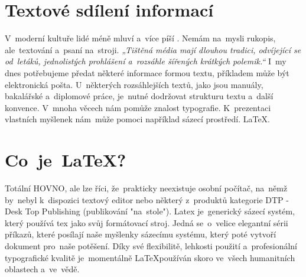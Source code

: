 \documentclass[11pt,a4paper,titlepage]{article}
\begin{document}
\section{Textové sdílení informací}
V~moderní kultuře lidé méně mluví a~více píší . Nemám na~mysli rukopis, ale~textování a~psaní na~stroji.
\cite{Ar_Luv2TxT}
\textit{„Tištěná média mají dlouhou tradici, odvíjející se od~letáků, jednolistých prohlášení a~rozsáhle šířených krátkých polemik.“}\cite{Douda_informace} I~my dnes potřebujeme předat některé informace formou textu, příkladem může být elektronická pošta. U~některých rozsáhlejších textů, jako jsou manuály, bakalářské a~diplomové práce, je~nutné dodržovat strukturu textu a~další konvence. V~mnoha věcech nám pomůže znalost typografie. K~prezentaci vlastních myšlenek nám~může pomoci například sázecí prostředí. \LaTeX .


\section{Co~je~\LaTeX?}
Totální HOVNO, ale lze říci, že~prakticky neexistuje osobní počítač, na~němž by~nebyl k~dispozici textový editor nebo některý z~produktů kategorie DTP - Desk Top Publishing (publikování "na~stole"). \cite{RybickaLatex}
Latex je~generický sázecí systém, který používá tex jako svůj formátovací stroj.\cite{Latex_companion} Jedná se~o~velice elegantní sérii příkazů, které posílají naše myšlenky sázecímu systému, který poté vytvoří dokument pro~naše potěšení.\cite{programujte}
Díky své flexibilitě, lehkosti použití a~profesionální typografické kvalitě je~momentálně \LaTeX používán skoro ve~všech humanitních oblastech a~ve~vědě.\cite{Latex_companion}


\newpage

\end{document}
